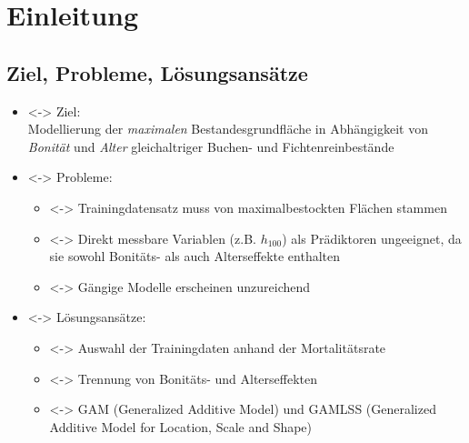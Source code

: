

\section{Einleitung}
\subsection{Ziel, Probleme, Lösungsansätze}
\begin{frame}[c]
  \begin{itemize}
  \item<\theFirstElement-> Ziel: \\
    Modellierung der \emph{maximalen} Bestandesgrundfläche in Abhängigkeit von \emph{Bonität} und \emph{Alter} gleichaltriger Buchen- und Fichtenreinbestände
  \item<\theSecondElement-> Probleme:
    \begin{itemize}
    \item<\theSecondElement-> Trainingdatensatz muss von maximalbestockten Flächen stammen
    \item<\theSecondElement-> Direkt messbare Variablen (z.B. \(h_{100}\)) als Prädiktoren ungeeignet, da sie sowohl Bonitäts- als auch Alterseffekte enthalten
    \item<\theSecondElement-> Gängige Modelle erscheinen unzureichend
    \end{itemize}
  \end{itemize}
  \begin{itemize}
  \item<\theThirdElement-> Lösungsansätze:
    \begin{itemize}
    \item<\theThirdElement-> Auswahl der Trainingdaten anhand der Mortalitätsrate
    \item<\theThirdElement-> Trennung von Bonitäts- und Alterseffekten
    \item<\theThirdElement-> GAM (Generalized Additive Model) und GAMLSS (Generalized Additive Model for Location, Scale and Shape)
    \end{itemize}
  \end{itemize}
\end{frame}

